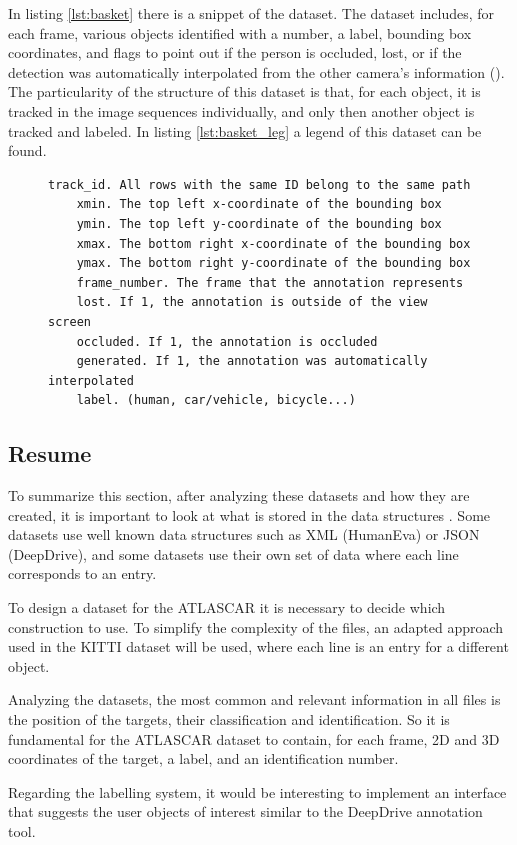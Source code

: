 In listing \ref{lst:basket} there is a snippet of the dataset. The dataset includes, for each frame, various objects identified with a number, a label, bounding box coordinates, and flags to point out if the person is occluded, lost, or if the detection was automatically interpolated from the other camera's information (\cite{EPFLEcolepolytechniquefederaledeLausanne}). The particularity of the structure of this dataset is that, for each object, it is tracked in the image sequences individually, and only then another object is tracked and labeled. In listing \ref{lst:basket_leg} a legend of this dataset can be found.

\begin{figure}[htp]

\begin{center}
	\begin{lstlisting}[label={lst:basket_leg}, caption={EPFL dataset legend.}]
	track_id. All rows with the same ID belong to the same path
	xmin. The top left x-coordinate of the bounding box
	ymin. The top left y-coordinate of the bounding box
	xmax. The bottom right x-coordinate of the bounding box
	ymax. The bottom right y-coordinate of the bounding box
	frame_number. The frame that the annotation represents
	lost. If 1, the annotation is outside of the view screen
	occluded. If 1, the annotation is occluded
	generated. If 1, the annotation was automatically interpolated
	label. (human, car/vehicle, bicycle...)	\end{lstlisting}
\end{center}

\end{figure}
 
\subsection{Resume}

To summarize this section, after analyzing these datasets and how they are created, it is important to look at what is stored in the data structures	. Some datasets use well known data structures such as XML (HumanEva) or JSON (DeepDrive), and some datasets use their own set of data where each line corresponds to an entry. 

To design a dataset for the ATLASCAR it is necessary to decide which construction to use. To simplify the complexity of the files, an adapted approach used in the KITTI dataset will be used, where each line is an entry for a different object.

Analyzing the datasets, the most common and relevant information in all files is the position of the targets, their classification and identification. So it is fundamental for the ATLASCAR dataset to contain, for each frame, 2D and 3D coordinates of the target, a label, and an identification number.

Regarding the labelling system, it would be interesting to implement an interface that suggests the user objects of interest similar to the DeepDrive annotation tool.



